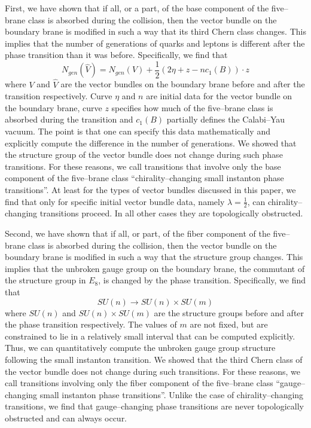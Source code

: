 \documentclass[a4paper,12pt]{article}
\numberwithin{equation}{section}
\theoremstyle{plain}
\begin{document}
 First, we have shown that if all, or a part, of
the base component of the five--brane class is absorbed during the collision,
then the vector bundle on the boundary brane is modified in such a way that
its third Chern class changes. This implies that the number of
generations of quarks and leptons is different after the phase transition than
it was before. Specifically, we find that
\begin{equation}
N_{gen}(\widehat{V})=N_{gen}(V) + \frac{1}{2}(2\eta + z- nc_{1}(B))\cdot z
\label{eq:220}
\end{equation}
where $V$ and $\widehat{V}$ are the vector bundles on the boundary brane before
and after the transition respectively. Curve $\eta$ and $n$ are 
initial data for the vector bundle on the boundary brane, curve $z$ 
specifies how much of the five--brane class is absorbed during the transition 
and $c_{1}(B)$ partially defines the Calabi--Yau vacuum. The point is that
one can specify this data mathematically and explicitly 
compute the difference in the
number of generations. We showed that the structure group of the
vector bundle does not change during such phase transitions. For these
reasons, we call transitions that involve only the base component of the
five--brane class ``chirality--changing small instanton 
phase transitions''.
At least for the types of vector bundles discussed in this paper, we find that
only for specific initial vector bundle data, namely $\lambda=\frac{1}{2}$,
can chirality--changing transitions proceed. In all other cases 
they are topologically obstructed. 

Second, we have shown that if all, or part, of the fiber component of the
five--brane class is absorbed during the collision, then the vector bundle on
the boundary brane is modified in such a way that the structure group changes.
This implies that the unbroken gauge group on the boundary brane, the
commutant of the structure group in $E_{8}$, is changed by the phase
transition. Specifically, we find that
\begin{equation}
SU(n) \longrightarrow SU(n) \times SU(m)
\label{eq:221}
\end{equation}
where $SU(n)$ and $SU(n) \times SU(m)$ are the structure groups before and
after the phase transition respectively. The values of $m$ are not fixed, but
are constrained to lie in a relatively small interval that can be computed
explicitly. Thus, we can quantitatively compute the unbroken gauge group
structure following the small instanton transition. We showed that the third
Chern class of the vector bundle does not change during such transitions. For
these reasons, we call transitions involving only the fiber component of the
five--brane class ``gauge--changing small instanton phase transitions''.
Unlike the case of chirality--changing transitions, we find that
gauge--changing phase transitions are never topologically obstructed and can
always occur.
\end{document}
